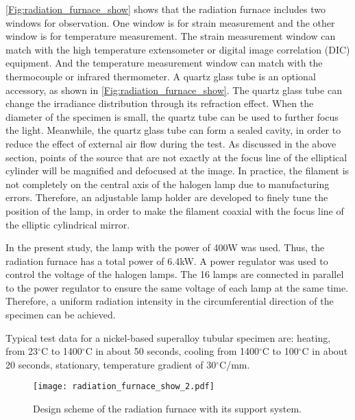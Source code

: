 \ref{Fig:radiation_furnace_show} shows that the radiation furnace includes two windows for observation. One window is for strain measurement and the other window is for temperature measurement. 
The strain measurement window can match with the high temperature extensometer or digital image correlation (DIC) equipment.
And the temperature measurement window can match with the thermocouple or infrared thermometer.
A quartz glass tube is an optional accessory, as shown in \ref{Fig:radiation_furnace_show}. The quartz glass tube can change the irradiance distribution through its refraction effect. When the diameter of the specimen is small, the quartz tube can be used to further focus the light. Meanwhile, the quartz glass tube can form a sealed cavity, in order to reduce the effect of external air flow during the test. As discussed in the above section, points of the source that are not exactly at the focus line of the elliptical cylinder will be magnified and defocused at the image. In practice, the filament is not completely on the central axis of the halogen lamp due to manufacturing errors. Therefore, an adjustable lamp holder are developed to finely tune the position of the lamp, in order to make the filament coaxial with the focus line of the elliptic cylindrical mirror.

In the present study, the lamp with the power of 400W was used. Thus, the radiation furnace has a total power of 6.4kW. A power regulator was used to control the voltage of the halogen lamps. The 16 lamps are connected in parallel to the power regulator to ensure the same voltage of each lamp at the same time. Therefore, a uniform radiation intensity in the circumferential direction of the specimen can be achieved.

Typical test data for a nickel-based superalloy tubular specimen are: heating, from 23$^\circ$C to 1400$^\circ$C in about 50 seconds, cooling from 1400$^\circ$C to 100$^\circ$C in about 20 seconds, stationary, temperature gradient of 30$^\circ$C/mm.




\begin{figure}[!htp]
	\centering
	\texttt{[image: radiation\_furnace\_show\_2.pdf]}
	\caption{Design scheme of the radiation furnace with its support system.}
	\label{Fig:radiation_furnace_show_2}
\end{figure}

